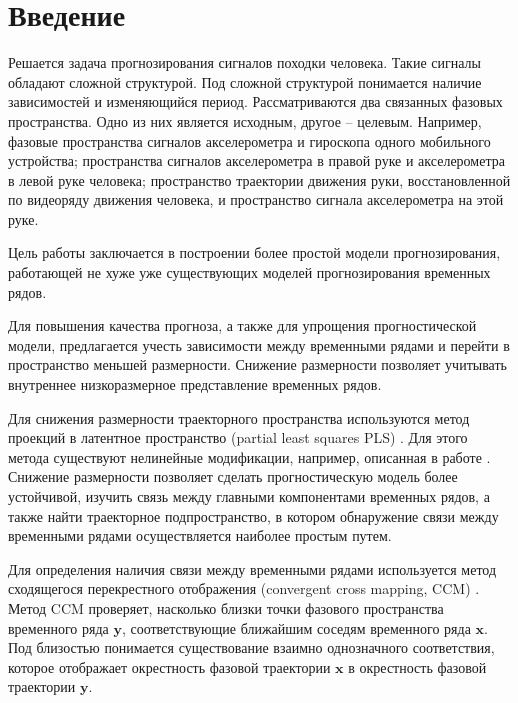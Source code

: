 \documentclass[12pt]{extarticle}
\newcommand{\bx}{\mathbf{x}}
\newcommand{\by}{\mathbf{y}}
\begin{document}






\section{Введение}


Решается задача прогнозирования сигналов походки человека. Такие сигналы обладают сложной структурой. Под сложной структурой понимается наличие зависимостей и изменяющийся период. Рассматриваются два связанных фазовых пространства. Одно из них является исходным, другое -- целевым. Например, фазовые пространства сигналов акселерометра и гироскопа одного мобильного устройства; пространства сигналов акселерометра в правой руке и акселерометра в левой руке человека; пространство траектории движения руки, восстановленной по видеоряду движения человека, и пространство сигнала акселерометра на этой руке.

Цель работы заключается в построении более простой модели прогнозирования, работающей не хуже уже существующих моделей прогнозирования временных рядов.

Для повышения качества прогноза, а также для упрощения прогностической модели, предлагается учесть зависимости между временными рядами и перейти в пространство меньшей размерности. Снижение размерности позволяет учитывать внутреннее низкоразмерное представление временных рядов. 


Для снижения размерности траекторного пространства используются метод проекций в латентное пространство (partial least squares PLS) \cite{geladi1988notes, hoskuldsson1988pls}. Для этого метода существуют нелинейные модификации, например, описанная в работе \cite{yaushev}. Снижение размерности позволяет сделать прогностическую модель более устойчивой, изучить связь между главными компонентами временных рядов, а также найти траекторное подпространство, в котором обнаружение связи между временными рядами осуществляется наиболее простым путем.

Для определения наличия связи между временными рядами используется метод сходящегося перекрестного отображения (convergent cross mapping, CCM) \cite{sugihara1990nonlinear, sugihara2012detecting}. Метод CCM проверяет, насколько близки точки фазового пространства временного ряда $\by$, соответствующие ближайшим соседям временного ряда $\bx$. Под близостью понимается существование взаимно однозначного соответствия, которое отображает окрестность фазовой траектории $\bx$ в окрестность фазовой траектории $\by$.
\end{document}
